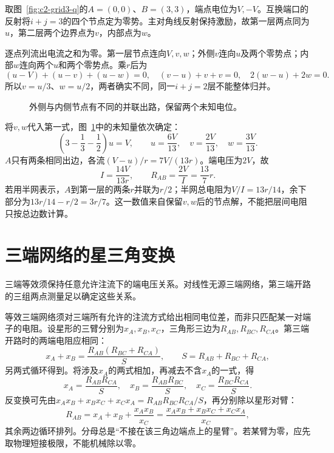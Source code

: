 \begin{solution}
取图~\ref{fig:c2-grid3-q}的$A=(0,0)$、$B=(3,3)$，端点电位为$V,-V$。互换端口的反射将$i+j=3$的四个节点定为零势。主对角线反射保持激励，故第一层两点同为$u$，第二层两个边界点为$v$，内部点为$w$。

逐点列流出电流之和为零。第一层节点连向$V,v,w$；外侧$v$连向$u$及两个零势点；内部$w$连向两个$u$和两个零势点。乘$r$后为
\[
 (u-V)+(u-v)+(u-w)=0,\quad
 (v-u)+v+v=0,\quad 2(w-u)+2w=0.
\]
所以$v=u/3$、$w=u/2$，两者确实不同，同一$i+j=2$层不能整体归并。
\begin{figure}[H]\centering
{}
\caption{外侧与内侧节点有不同的并联出路，保留两个未知电位。}\label{fig:c2-grid3-s}
\end{figure}
将$v,w$代入第一式，图~\ref{fig:c2-grid3-s}中的未知量依次确定：
\[
 \left(3-\frac13-\frac12\right)u=V,
 \qquad u=\frac{6V}{13},\quad v=\frac{2V}{13},\quad w=\frac{3V}{13}.
\]
$A$只有两条相同出边，各流$(V-u)/r=7V/(13r)$。端电压为$2V$，故
\[
 I=\frac{14V}{13r},\qquad\boxed{R_{AB}=\frac{2V}I=\frac{13}7r}.
\]
若用半网表示，$A$到第一层的两条$r$并联为$r/2$；半网总电阻为$V/I=13r/14$，余下部分为$13r/14-r/2=3r/7$。这一数值来自保留$v,w$后的节点解，不能把层间电阻只按总边数计算。
\end{solution}


\section{三端网络的星三角变换}\label{sec:c2-star}
三端等效须保持任意允许注流下的端电压关系。对线性无源三端网络，第三端开路的三组两点测量足以确定这些关系。

等效三端网络须对三端所有允许的注流方式给出相同电位差，而非只匹配某一对端子的电阻。设星形的三臂分别为$x_A,x_B,x_C$，三角形三边为$R_{AB},R_{BC},R_{CA}$。第三端开路时的两端电阻应相同：
\[
 x_A+x_B=\frac{R_{AB}(R_{BC}+R_{CA})}{S},\qquad
 S=R_{AB}+R_{BC}+R_{CA},
\]
另两式循环得到。将涉及$x_A$的两式相加，再减去不含$x_A$的一式，得
\[
 \boxed{x_A=\frac{R_{AB}R_{CA}}S},\quad
 x_B=\frac{R_{AB}R_{BC}}S,\quad x_C=\frac{R_{BC}R_{CA}}S.
\]
反变换可先由$x_Ax_B+x_Bx_C+x_Cx_A
=R_{AB}R_{BC}R_{CA}/S$，再分别除以星形对臂：
\[
 \boxed{R_{AB}=x_A+x_B+\frac{x_Ax_B}{x_C}
 =\frac{x_Ax_B+x_Bx_C+x_Cx_A}{x_C}},
\]
其余两边循环排列。分母总是“不接在该三角边端点上的星臂”。若某臂为零，应先取物理短接极限，不能机械除以零。


